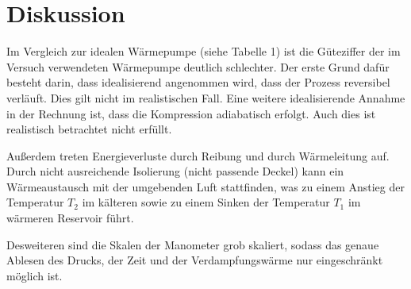 \section{Diskussion}
\label{sec:Diskussion}

Im Vergleich zur idealen Wärmepumpe (siehe Tabelle 1) ist die Güteziffer der im Versuch verwendeten Wärmepumpe deutlich schlechter. Der erste Grund dafür besteht darin, dass idealisierend angenommen wird, dass der Prozess reversibel verläuft. Dies gilt nicht im realistischen Fall. Eine weitere idealisierende Annahme in der Rechnung ist, dass die Kompression adiabatisch erfolgt. Auch dies ist realistisch betrachtet nicht erfüllt.

Außerdem treten Energieverluste durch Reibung und durch Wärmeleitung auf. Durch nicht ausreichende Isolierung (nicht passende Deckel) kann ein Wärmeaustausch mit der umgebenden Luft stattfinden, was zu einem Anstieg der Temperatur $T_{2}$ im kälteren sowie zu einem Sinken der Temperatur $T_{1}$ im wärmeren Reservoir führt.

Desweiteren sind die Skalen der Manometer grob skaliert, sodass das genaue Ablesen des Drucks, der Zeit und der Verdampfungswärme nur eingeschränkt möglich ist.
